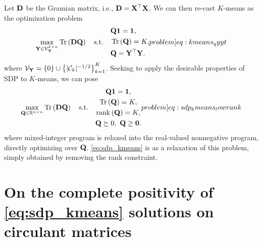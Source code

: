 \documentclass[twoside,11pt]{article}
\begin{document}
Let ${\mathbf{D}}$ be the Gramian matrix, i.e., ${\mathbf{D}} = {{\mathbf{X}}}^\top {\mathbf{X}}$.
We can then re-cast $K$-means as the optimization problem
\begin{equation}
\max_{\mat{Y} \in \set{V}_{\mat{Y}}^{k \times n}}
\traceone{\mat{D} \mat{Q}}
%
\quad\text{s.t.}\quad
%
\begin{aligned}
& \mat{Q} \vect{1} = \vect{1} , \\
& \traceone{\mat{Q}} = K , \\
& \mat{Q} = \transpose{\mat{Y}} \mat{Y} .
\end{aligned}
\label[problem]{eq:kmeans_qyyt}
\end{equation}
where ${\mathcal{V}}_{{\mathbf{Y}}} = \{ 0 \} \cup \left\{ |{\mathcal{C}}_k|^{-1/2} \right\}_{k=1}^{K}$.
Seeking to apply the desirable properties of SDP to $K$-means, we can pose \citep{Kulis2007,Peng2007_sdk-kmeans}
\begin{equation}
\max_{\mat{Q} \in \Real^{n \times n}}
\traceone{\mat{D} \mat{Q}}
%
\quad\text{s.t.}\quad
%
\begin{gathered}
\mat{Q} \vect{1} = \vect{1} , \\	
\traceone{\mat{Q}} = K , \\
\rank{\mat{Q}} = K , \\
\mat{Q} \succeq 0 ,\
\mat{Q} \geq \mat{0} .
\end{gathered}
\label[problem]{eq:sdp_kmeans_lowrank}	
\end{equation}
where mixed-integer program is relaxed into the real-valued nonnegative program, directly optimizing over ${\mathbf{Q}}$. 
\ref{eq:sdp_kmeans} is as a relaxation of this problem, simply obtained by removing the rank constraint.

\section{On the complete positivity of \ref{eq:sdp_kmeans} solutions on circulant matrices}
\label{sec:proofs}

\end{document}
